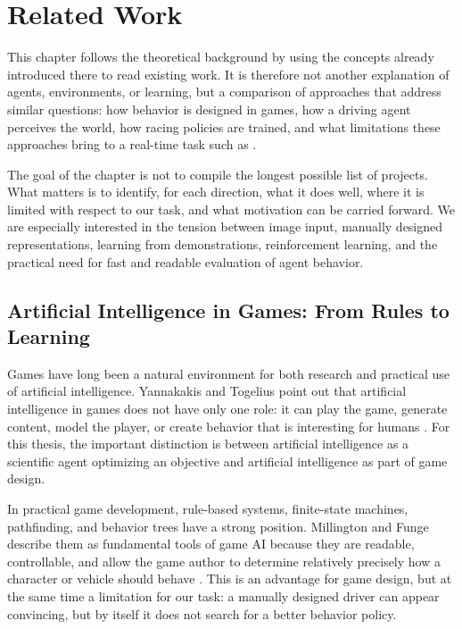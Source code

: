 \chapter{Related Work}

This chapter follows the theoretical background by using the concepts already introduced there to read existing work. It is therefore not another explanation of agents, environments, or learning, but a comparison of approaches that address similar questions: how behavior is designed in games, how a driving agent perceives the world, how racing policies are trained, and what limitations these approaches bring to a real-time task such as \Trackmania{}.

The goal of the chapter is not to compile the longest possible list of projects. What matters is to identify, for each direction, what it does well, where it is limited with respect to our task, and what motivation can be carried forward. We are especially interested in the tension between image input, manually designed representations, learning from demonstrations, reinforcement learning, and the practical need for fast and readable evaluation of agent behavior.

\section{Artificial Intelligence in Games: From Rules to Learning}

Games have long been a natural environment for both research and practical use of artificial intelligence. Yannakakis and Togelius point out that artificial intelligence in games does not have only one role: it can play the game, generate content, model the player, or create behavior that is interesting for humans \cite{yannakakis_togelius2018aigames}. For this thesis, the important distinction is between artificial intelligence as a scientific agent optimizing an objective and artificial intelligence as part of game design.

In practical game development, rule-based systems, finite-state machines, pathfinding, and behavior trees have a strong position. Millington and Funge describe them as fundamental tools of game AI because they are readable, controllable, and allow the game author to determine relatively precisely how a character or vehicle should behave \cite{millington_funge2019ai_for_games}. This is an advantage for game design, but at the same time a limitation for our task: a manually designed driver can appear convincing, but by itself it does not search for a better behavior policy.

